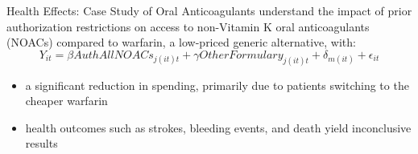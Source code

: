 \begin{frame}{Health Effects: Case Study of Oral Anticoagulants}
    understand the impact of prior authorization restrictions on access to non-Vitamin K oral anticoagulants (NOACs) compared to warfarin, a low-priced generic alternative, with:
    $$Y_{it}=\beta AuthAllNOACs_{j(it)t} + \gamma OtherFormulary_{j(it)t} + \delta_{m(it)} + \epsilon_{it} $$

    \begin{itemize}
        \item a significant reduction in spending, primarily due to patients switching to the cheaper warfarin
        \item health outcomes such as strokes, bleeding events, and death yield inconclusive results
    \end{itemize}
\end{frame}